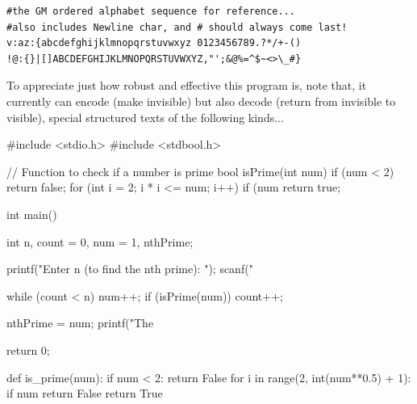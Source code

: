 \documentclass[a4paper, 18pt]{book} %
\begin{document}
{{{\vspace{2em}

\vspace{1em}

  \begin{tcolorbox}[teaterminalstyle, title=EXTENDED Ghost Messages Symbol Set, breakable]
  \begin{lstlisting}[language=TEA,breaklines=true,]
#the GM ordered alphabet sequence for reference...
#also includes Newline char, and # should always come last!
v:az:{abcdefghijklmnopqrstuvwxyz 0123456789.?*/+-()
!@:{}|[]ABCDEFGHIJKLMNOPQRSTUVWXYZ,"';&@%=^$~<>\_#}
   \end{lstlisting}
  \end{tcolorbox}

\vspace{1em}


To appreciate just how robust and effective this program is, note that, it currently can encode (make invisible) but also decode (return from invisible to visible), special structured texts of the following kinds...

\vspace{2em}


\vspace{2em}


     \begin{tcbverbatim}[title=Sample INPUTS handled by Ghost Messages: C-Programs]
#include <stdio.h>
#include <stdbool.h>

// Function to check if a number is prime
bool isPrime(int num) {
    if (num < 2) return false;
    for (int i = 2; i * i <= num; i++) {
        if (num %
    }
    return true;
}

int main() {
    int n, count = 0, num = 1, nthPrime;

    printf("Enter n (to find the nth prime): ");
    scanf("%

    while (count < n) {
        num++;
        if (isPrime(num)) {
            count++;
        }
    }

    nthPrime = num;
    printf("The %

    return 0;
}

  \end{tcbverbatim}

\vspace{1em}


     \begin{tcbverbatim}[title=Sample INPUTS handled by Ghost Messages: Python-Programs]
def is_prime(num):
    if num < 2:
        return False
    for i in range(2, int(num**0.5) + 1):
        if num %
            return False
    return True


\end{tcbverbatim}}}}
\end{document}
